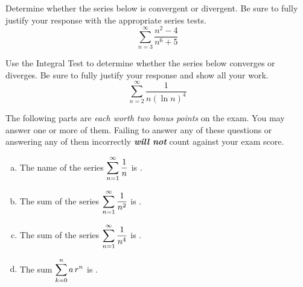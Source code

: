 \documentclass[12pt,letterpaper]{exam}
\begin{document}
\begin{questions}
\newpage
\question[10] Determine whether the series below is convergent or divergent. Be sure to fully justify your response with the appropriate series tests.
	\[
	\sum_{n=3}^\infty \dfrac{n^2 - 4}{n^6 + 5}
	\]



\newpage
\question[15] Use the Integral Test to determine whether the series below converges or diverges. Be sure to fully justify your response and show all your work. 
	\[
	\sum_{n=2}^\infty \dfrac{1}{n (\ln n)^4}
	\]



\newpage
{} The following parts are \textit{each worth two bonus points} on the exam. You may answer one or more of them. Failing to answer any of these questions or answering any of them incorrectly \textit{\bfseries will not} count against your exam score. \par\vspace{0.5cm}
	\begin{enumerate}[(a)]
	\item The name of the series $\displaystyle\sum_{n=1}^\infty \dfrac{1}{n}$ is \underline{\hspace{2cm} \phantom{\itshape the Harmonic Series} \hspace{2cm}}. \par\vspace{0.1cm}
	
	\item The sum of the series $\displaystyle\sum_{n=1}^\infty \dfrac{1}{n^2}$ is \underline{\hspace{2cm}  \hspace{2cm}}. \par\vspace{0.1cm}
	
	\item The sum of the series $\displaystyle\sum_{n=1}^\infty \dfrac{1}{n^4}$ is \underline{\hspace{2cm}  \hspace{2cm}}. \par\vspace{0.1cm}
	
	\item The sum $\displaystyle\sum_{k=0}^n a\, r^n$ is \underline{\hspace{2cm}  \hspace{2cm}}. \par\vspace{0.1cm}
	

\end{enumerate}
\end{questions}
\end{document}
